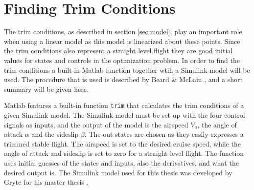 \section{Finding Trim Conditions}

The trim conditions, as described in section \ref{sec:model}, play an important role when using a linear model as this model is linearized about these points. Since the trim conditions also represent a straight level flight they are good initial values for states and controls in the optimization problem. In order to find the trim conditions a built-in Matlab function together wtih a Simulink model will be used. The procedure that is used is described by Beard \& McLain \cite{uavBEARD}, and a short summary will be given here.

Matlab features a built-in function \texttt{trim} that calculates the trim conditions of a given Simulink model. The Simulink model must be set up with the four control signals as inputs, and the output of the model is the airspeed $V_a$, the angle of attack $\alpha$ and the sideslip $\beta$. The out states are chosen as they easily expresses a trimmed stable flight. The airspeed is set to the desired cruise speed, while the angle of attack and sideslip is set to zero for a straight level flight. The function uses initial guesses of the states and inputs, also the derivatives, and what the desired output is. The Simulink model used for this thesis was developed by Gryte for his master thesis \cite{GRYTE}.